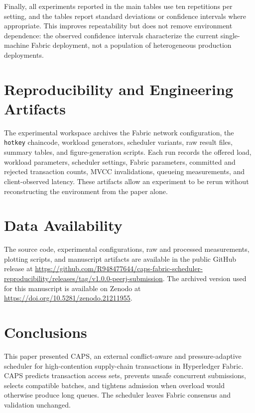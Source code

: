\documentclass[fleqn,10pt,lineno]{wlpeerj}
\begin{document}
Finally, all experiments reported in the main tables use ten repetitions per setting, and the tables report standard deviations or confidence intervals where appropriate. This improves repeatability but does not remove environment dependence: the observed confidence intervals characterize the current single-machine Fabric deployment, not a population of heterogeneous production deployments.

\section*{Reproducibility and Engineering Artifacts}

The experimental workspace archives the Fabric network configuration, the \texttt{hotkey} chaincode, workload generators, scheduler variants, raw result files, summary tables, and figure-generation scripts. Each run records the offered load, workload parameters, scheduler settings, Fabric parameters, committed and rejected transaction counts, MVCC invalidations, queueing measurements, and client-observed latency. These artifacts allow an experiment to be rerun without reconstructing the environment from the paper alone.

\section*{Data Availability}

\begin{sloppypar}
The source code, experimental configurations, raw and processed measurements, plotting scripts, and manuscript artifacts are available in the public GitHub release at \url{https://github.com/R948477644/caps-fabric-scheduler-reproducibility/releases/tag/v1.0.0-peerj-submission}. The archived version used for this manuscript is available on Zenodo at \url{https://doi.org/10.5281/zenodo.21211955}.
\end{sloppypar}

\section*{Conclusions}

This paper presented CAPS, an external conflict-aware and pressure-adaptive scheduler for high-contention supply-chain transactions in Hyperledger Fabric. CAPS predicts transaction access sets, prevents unsafe concurrent submissions, selects compatible batches, and tightens admission when overload would otherwise produce long queues. The scheduler leaves Fabric consensus and validation unchanged.
\end{document}
